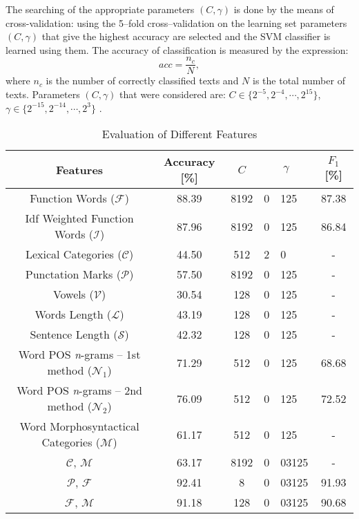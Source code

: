 \documentclass{llncs}
\begin{document}
The searching of the appropriate parameters $(C, \gamma)$ is done by the means
of cross-validation: using the 5--fold cross--validation on the
learning set parameters $(C, \gamma)$ that give the highest accuracy are
selected and the SVM classifier is learned using them. 
The accuracy of classification is measured by the expression:
\begin{equation}
acc = \frac{n_c}{N}, %
\end{equation}
where $n_c$ is the number of correctly classified texts and $N$ is the total number of
texts.
Parameters $(C, \gamma)$ that were considered are: $C \in \{2^{-5}, 2^{-4},
\cdots , 2^{15}\}$, $\gamma \in \{2^{-15}, 2^{-14}, \cdots, 2^3\}$ \cite{CC01a}.

\begin{table*}[htb]
\begin{center}%
\caption{Evaluation of Different Features}%
\begin{tabular}{c c c r@{.}l@{~~} c}%
\toprule%
Features & Accuracy [\%] & $C$ & \multicolumn{2}{c}{$\gamma$} & $F_1$ [\%] \\
\midrule
Function Words ($\mathcal{F}$) & 88.39 & 8192 & 0 & 125 & 87.38\\
Idf Weighted Function Words ($\mathcal{I}$) & 87.96 & 8192 & 0 & 125 & 86.84\\
Lexical Categories ($\mathcal{C}$) & 44.50 & 512 & 2 & 0 & -\\
Punctation Marks ($\mathcal{P}$) & 57.50 & 8192 & 0 & 125 & -\\
Vowels ($\mathcal{V}$) & 30.54 & 128 & 0 & 125 & -\\
Words Length ($\mathcal{L}$) & 43.19 & 128 & 0 & 125 & -\\
Sentence Length ($\mathcal{S}$) & 42.32 & 128 & 0 & 125 & -\\
Word POS \emph{n}-grams -- 1st method ($\mathcal{N}_1$) & 71.29 &
512 & 0 & 125 & 68.68\\
Word POS \emph{n}-grams -- 2nd method ($\mathcal{N}_2$) & 76.09
& 512 & 0 & 125 & 72.52\\
Word Morphosyntactical Categories ($\mathcal{M}$) & 61.17 & 512 & 0 & 125 &
-\\
$\mathcal{C}$, $\mathcal{M}$ & 63.17 & 8192 & 0 & 03125 & -\\
$\mathcal{P}$, $\mathcal{F}$ & 92.41 & 8 & 0 & 03125 & 91.93\\
$\mathcal{F}$, $\mathcal{M}$ & 91.18 & 128 & 0 & 03125 & 90.68\\

\end{tabular}
\end{center}
\end{table*}
\end{document}
